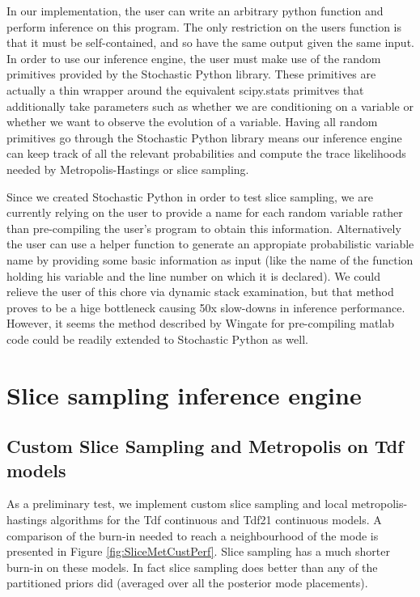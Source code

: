 In our implementation, the user can write an arbitrary python function and perform inference on this program. The only restriction on the users function is that it must be self-contained, and so have the same output given the same input. In order to use our inference engine, the user must make use of the random primitives provided by the Stochastic Python library. These primitives are actually a thin wrapper around the equivalent scipy.stats primitves that additionally take parameters such as whether we are conditioning on a variable or whether we want to observe the evolution of a variable. Having all random primitives go through the Stochastic Python library means our inference engine can keep track of all the relevant probabilities and compute the trace likelihoods needed by Metropolis-Hastings or slice sampling.

Since we created Stochastic Python in order to test slice sampling, we are currently relying on the user to provide a name for each random variable rather than pre-compiling the user's program to obtain this information. Alternatively the user can use a helper function to generate an appropiate  probabilistic variable name by providing some basic information as input (like the name of the function holding his variable and the line number on which it is declared). We could relieve the user of this chore via dynamic stack examination, but that method proves to be a hige bottleneck causing 50x slow-downs in inference performance. However, it seems the method described by Wingate \cite{wingate2011lightweight} for pre-compiling matlab code could be readily extended to Stochastic Python as well. 

\section{Slice sampling inference engine}
\subsection{Custom Slice Sampling and Metropolis on Tdf models}

As a preliminary test, we implement custom slice sampling and local metropolis-hastings algorithms for the Tdf continuous and Tdf21 continuous models. A comparison of the burn-in needed to reach a neighbourhood of the mode is presented in Figure \ref{fig:SliceMetCustPerf}. Slice sampling has a much shorter burn-in on these models. In fact slice sampling does better than any of the partitioned priors did (averaged over all the posterior mode placements).

